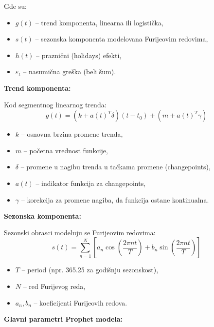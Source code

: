 \documentclass[12pt]{article}
\begin{document}
Gde su:
\begin{itemize}
    \item $g(t)$ -- trend komponenta, linearna ili logistička,
    \item $s(t)$ -- sezonska komponenta modelovana Furijeovim redovima,
    \item $h(t)$ -- praznični (holidays) efekti,
    \item $\varepsilon_t$ -- nasumična greška (beli šum).
\end{itemize}

\textbf{Trend komponenta:}

Kod segmentnog linearnog trenda:
\begin{equation}
g(t) = (k + a(t)^T \delta) (t - t_0) + (m + a(t)^T \gamma)
\end{equation}

\begin{itemize}
    \item $k$ -- osnovna brzina promene trenda,
    \item $m$ -- početna vrednost funkcije,
    \item $\delta$ -- promene u nagibu trenda u tačkama promene (changepoints),
    \item $a(t)$ -- indikator funkcija za changepoints,
    \item $\gamma$ -- korekcija za promene nagiba, da funkcija ostane kontinualna.
\end{itemize}

\textbf{Sezonska komponenta:}

Sezonski obrasci modeluju se Furijeovim redovima:
\begin{equation}
s(t) = \sum_{n=1}^{N} \left[ a_n \cos \left( \frac{2 \pi n t}{T} \right) + b_n \sin \left( \frac{2 \pi n t}{T} \right) \right]
\end{equation}

\begin{itemize}
    \item $T$ -- period (npr. 365.25 za godišnju sezonskost),
    \item $N$ -- red Furijevog reda,
    \item $a_n, b_n$ -- koeficijenti Furijeovih redova.
\end{itemize}

\textbf{Glavni parametri Prophet modela:}
\end{document}
